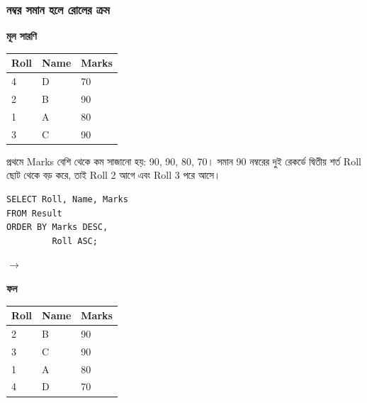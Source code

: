 \subsubsection{নম্বর সমান হলে রোলের ক্রম}
\par\smallskip\noindent
\begin{minipage}[t]{.34\linewidth}\vspace{0pt}\raggedright
\small\textbf{মূল সারণি}

\begin{tabular}{|l|l|l|}
\hline
Roll & Name & Marks
\\ \hline
4 & D & 70
\\ \hline
2 & B & 90
\\ \hline
1 & A & 80
\\ \hline
3 & C & 90
\\ \hline
\end{tabular}
\end{minipage}\hfill
\begin{minipage}[t]{.63\linewidth}\vspace{0pt}\raggedright
প্রথমে Marks বেশি থেকে কম সাজানো হয়: 90, 90, 80, 70। সমান 90 নম্বরের দুই রেকর্ডে দ্বিতীয় শর্ত Roll ছোট থেকে বড় করে, তাই Roll 2 আগে এবং Roll 3 পরে আসে।
\end{minipage}\par\smallskip
\par\smallskip\noindent\begin{minipage}[c]{.55\linewidth}
\begin{verbatim}
SELECT Roll, Name, Marks
FROM Result
ORDER BY Marks DESC,
         Roll ASC;
\end{verbatim}
\end{minipage}\hfill\(\longrightarrow\)\hfill
\begin{minipage}[c]{.35\linewidth}\small\textbf{ফল}

\begin{tabular}{|l|l|l|}
\hline
Roll & Name & Marks
\\ \hline
2 & B & 90
\\ \hline
3 & C & 90
\\ \hline
1 & A & 80
\\ \hline
4 & D & 70
\\ \hline
\end{tabular}
\end{minipage}\par\smallskip


